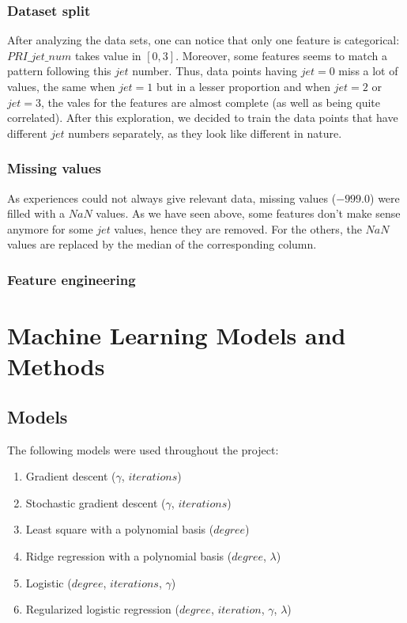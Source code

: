 \documentclass[10pt,conference,compsocconf]{IEEEtran}
\begin{document}
\subsubsection{Dataset split}

After analyzing the data sets, one can notice that only one feature is categorical: $PRI\_jet\_num$ takes value in $[0,3]$. Moreover, some features seems to match a pattern following this $jet$ number. Thus, data points having $jet=0$ miss a lot of values, the same when $jet=1$ but in a lesser proportion and when $jet=2$ or $jet=3$, the vales for the features are almost complete (as well as being quite correlated). After this exploration, we decided to train the data points that have different $jet$ numbers separately, as they look like different in nature.

\subsubsection{Missing values}

As experiences could not always give relevant data, missing values ($-999.0$) were filled with a $NaN$ values. As we have seen above, some features don't make sense anymore for some $jet$ values, hence they are removed. For the others, the $NaN$ values are replaced by the median of the corresponding column.

\subsubsection{Feature engineering}

\section{Machine Learning Models and Methods}

\subsection{Models}

The following models were used throughout the project:

\begin{enumerate}
\item Gradient descent ($\gamma$, $iterations$)
\item Stochastic gradient descent ($\gamma$, $iterations$)
\item Least square with a polynomial basis ($degree$)
\item Ridge regression with a polynomial basis ($degree$, $\lambda$)
\item Logistic ($degree$, $iterations$, $\gamma$)
\item Regularized logistic regression ($degree$, $iteration$, $\gamma$, $\lambda$)
\end{enumerate}
\end{document}
